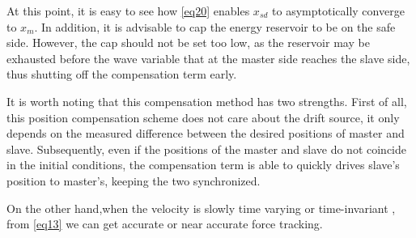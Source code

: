 At this point,
it is easy to see how \eqref{eq20} enables $x_{sd}$ to asymptotically converge to $x_m$.
In addition, it is advisable to cap the energy reservoir to be on the safe side.
However, the cap should not be set too low,
as the reservoir may be exhausted 
before the wave variable that at the master side reaches the slave side,
thus shutting off the compensation term early.
\par It is worth noting that this compensation method has two strengths.
First of all, this position compensation scheme does not care about the drift source,
it only depends on the measured difference between the desired positions of master and slave.
Subsequently, 
even if the positions of the master and slave 
do not coincide in the initial conditions,
the compensation term is able to quickly drives slave's position to master's, 
keeping the two synchronized.
\par On the other hand,when the velocity is slowly time varying  or time-invariant ,
from \eqref{eq13} we can get accurate or near accurate force tracking.







